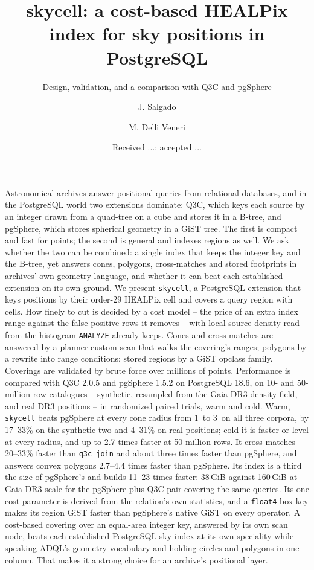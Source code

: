 \title{skycell: a cost-based HEALPix index for sky positions in PostgreSQL}
\subtitle{Design, validation, and a comparison with Q3C and pgSphere}

\author{J. Salgado
  \and M. Delli Veneri}


\date{Received ...; accepted ...}

\abstract
{Astronomical archives answer positional queries from relational databases, and in the
PostgreSQL world two extensions dominate: Q3C, which keys each source by an integer
drawn from a quad-tree on a cube and stores it in a B-tree, and pgSphere, which stores
spherical geometry in a GiST tree. The first is compact and fast for points; the second
is general and indexes regions as well.}
{We ask whether the two can be combined: a single index that keeps the integer key and
the B-tree, yet answers cones, polygons, cross-matches and stored footprints in
archives' own geometry language, and whether it can beat each established extension on
its own ground.}
{We present \texttt{skycell}, a PostgreSQL extension that keys positions by their
order-29 HEALPix cell and covers a query region with cells. How finely to cut is decided
by a cost model -- the price of an extra index range against the false-positive rows it
removes -- with local source density read from the histogram \texttt{ANALYZE} already
keeps. Cones and cross-matches are answered by a planner custom scan that walks the
covering's ranges; polygons by a rewrite into range conditions; stored regions by a
GiST opclass family. Coverings are validated by brute force over millions of points.
Performance is compared with Q3C 2.0.5 and pgSphere 1.5.2 on PostgreSQL 18.6, on 10-
and 50-million-row catalogues -- synthetic, resampled from the Gaia DR3 density field,
and real DR3 positions -- in randomized paired trials, warm and cold.}
{Warm, \texttt{skycell} beats pgSphere at every cone radius from 1\arcsec\ to 3\degr\ on
all three corpora, by 17--33\% on the synthetic two and 4--31\% on real positions; cold
it is faster or level at every radius, and up to 2.7 times faster at 50 million rows. It
cross-matches 20--33\% faster than \texttt{q3c\_join} and about three times faster than
pgSphere, and answers convex polygons 2.7--4.4 times faster than pgSphere. Its index is
a third the size of pgSphere's and builds 11--23 times faster: 38\,GiB against
160\,GiB at Gaia DR3 scale for the pgSphere-plus-Q3C pair covering the same queries. Its
one cost parameter is derived from the relation's own statistics, and a \texttt{float4}
box key makes its region GiST faster than pgSphere's native GiST on every operator.}
{A cost-based covering over an equal-area integer key, answered by its own scan node,
beats each established PostgreSQL sky index at its own speciality while speaking ADQL's
geometry vocabulary and holding circles and polygons in one column. That makes it a
strong choice for an archive's positional layer.}

